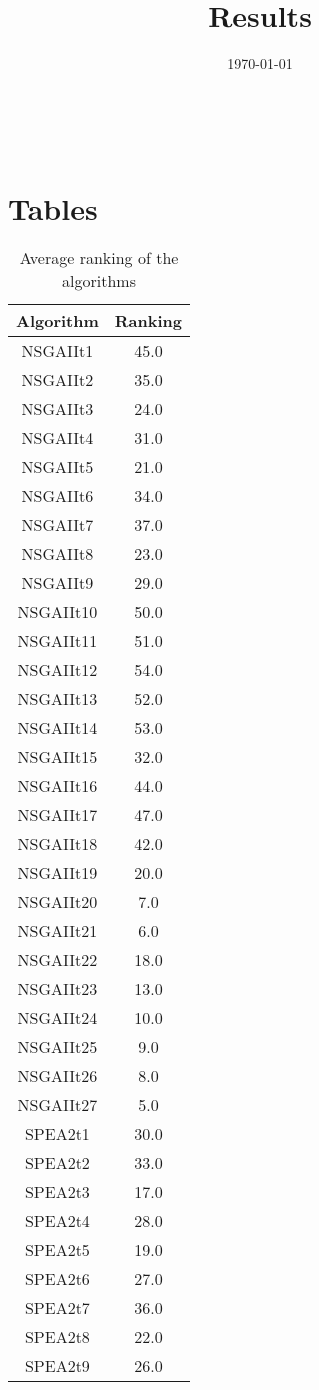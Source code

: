 \documentclass{article}
\title{Results}
\author{}
\date{\today}
\begin{document}
\oddsidemargin 0in \topmargin 0in\maketitle
\
\section{Tables}
\begin{table}[!htp]
\centering
\caption{Average ranking of the algorithms}
\begin{tabular}{c|c}
Algorithm&Ranking\\
\hline
NSGAIIt1&45.0\\
NSGAIIt2&35.0\\
NSGAIIt3&24.0\\
NSGAIIt4&31.0\\
NSGAIIt5&21.0\\
NSGAIIt6&34.0\\
NSGAIIt7&37.0\\
NSGAIIt8&23.0\\
NSGAIIt9&29.0\\
NSGAIIt10&50.0\\
NSGAIIt11&51.0\\
NSGAIIt12&54.0\\
NSGAIIt13&52.0\\
NSGAIIt14&53.0\\
NSGAIIt15&32.0\\
NSGAIIt16&44.0\\
NSGAIIt17&47.0\\
NSGAIIt18&42.0\\
NSGAIIt19&20.0\\
NSGAIIt20&7.0\\
NSGAIIt21&6.0\\
NSGAIIt22&18.0\\
NSGAIIt23&13.0\\
NSGAIIt24&10.0\\
NSGAIIt25&9.0\\
NSGAIIt26&8.0\\
NSGAIIt27&5.0\\
SPEA2t1&30.0\\
SPEA2t2&33.0\\
SPEA2t3&17.0\\
SPEA2t4&28.0\\
SPEA2t5&19.0\\
SPEA2t6&27.0\\
SPEA2t7&36.0\\
SPEA2t8&22.0\\
SPEA2t9&26.0\\

\end{tabular}
\end{table}
\end{document}
